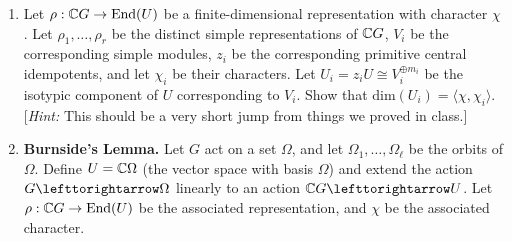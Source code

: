 \documentclass[11pt, reqno]{amsart}
\theoremstyle{plain}
\theoremstyle{definition}
\theoremstyle{example}
\def\<{\langle} \def\>{\rangle}
\def\dim{\mathrm{dim}}
\def\End{\mathrm{End}}
\def\acts{\lefttorightarrow}
\begin{document}
\begin{enumerate}[I ]
\begin{enumerate}[1.]
\item Let $\rho: \CC G \to \End(U)$ be a finite-dimensional representation with character $\chi$. Let $\rho_1, \dots, \rho_r$ be the distinct simple representations of $\mathbb{C} G$, $V_i$ be the corresponding simple modules, $z_i$ be the corresponding primitive central idempotents, and let $\chi_i$ be their characters. Let $U_i = z_i U  \cong V_i^{\oplus m_i}$ be the isotypic component of $U$ corresponding to $V_i$. Show that $\dim(U_i) = \<\chi,\chi_i\>$. \\
{[\emph{Hint:} This should be a very short jump from things we proved in class.]}




\item \textbf{Burnside's Lemma.}\label{permutation action} Let $G$ act on a set $\Omega$, and let $\Omega_1, \dots, \Omega_\ell$ be the orbits of $\Omega$. Define $U = \mathbb{C} \Omega$ (the vector space with basis $\Omega$) and extend the action $G \acts \Omega$ linearly to an action $\CC G \acts U$. Let $\rho: \CC G \to \End(U)$ be the associated representation, and $\chi$ be the associated character. 


\end{enumerate}
\end{enumerate}
\end{document}
